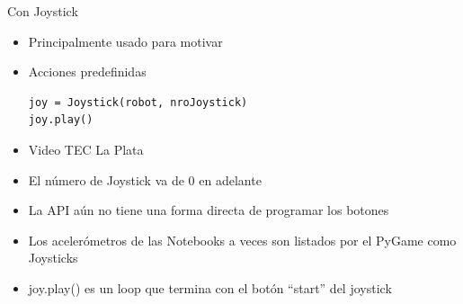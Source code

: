 \documentclass{beamer}[10]
\begin{document}
\begin{frame}[fragile]{Con Joystick}
	\begin{itemize}[<+->]
		\item Principalmente usado para motivar
		\item Acciones predefinidas
\begin{block}{}
\begin{lstlisting}
joy = Joystick(robot, nroJoystick)
joy.play()
\end{lstlisting}
\end{block}
		\item Video TEC La Plata
		\item El número de Joystick va de 0 en adelante
		\item La API aún no tiene una forma directa de programar los botones
		\item Los acelerómetros de las Notebooks a veces son listados por el PyGame como Joysticks
		\item joy.play() es un loop que termina con el botón ``start'' del joystick
	\end{itemize}
\end{frame}
\end{document}
